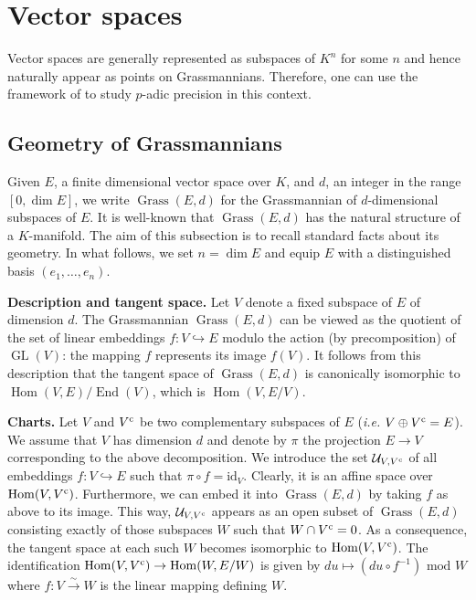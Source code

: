 \documentclass{sig-alternate-2013}
\DeclareMathOperator{\Hom}{Hom}
\DeclareMathOperator{\End}{End}
\DeclareMathOperator{\GL}{GL}
\DeclareMathOperator{\Grass}{Grass}
\newcommand{\id}{\textrm{id}}
\renewcommand{\c}{\text{\rm c}}
\def\todo#1{\ \!\!{\color{red} #1}}
\begin{document}
%

\section{Vector spaces}
\label{sec:vectorspaces}

Vector spaces are generally represented as subspaces of $K^n$ for some 
$n$ and hence naturally appear as points on Grassmannians. Therefore, 
one can use the framework of \cite[Appendix A]{caruso-roe-vaccon:14a} to 
study $p$-adic precision in this context.

\subsection{Geometry of Grassmannians}
\label{ssec:grassgeo}

Given $E$, a finite dimensional vector space over $K$, and $d$, an 
integer in the range $[0, \dim E]$, we write $\Grass(E,d)$ for the
Grassmannian of $d$-dimensional subspaces of $E$. It is well-known
that $\Grass(E,d)$ has the natural structure of a $K$-manifold. The aim of
this subsection is to recall standard facts about its geometry. In what follows,
we set $n = \dim E$ and equip $E$ with a distinguished basis
$(e_1, \ldots, e_n)$.

\smallskip

\noindent
{\bf Description and tangent space.}
Let $V$ denote a fixed subspace of $E$ of dimension $d$. The 
Grassmannian $\Grass(E,d)$ can be viewed as the quotient of the set 
of linear embeddings $f: V \hookrightarrow E$ modulo the action (by 
precomposition) of $\GL(V)$: the mapping $f$ represents its image 
$f(V)$. It follows from this description that the tangent space of 
$\Grass(E,d)$ is canonically isomorphic to $\Hom(V, E) / \End(V)$,
which is $\Hom(V, E/V)$.

\smallskip

\noindent
{\bf Charts.}
Let $V$ and $V^\c$ be two complementary subspaces of $E$ 
(\emph{i.e.} $V \oplus V^\c = E$). We assume that $V$ has 
dimension $d$ and denote by $\pi$ the projection $E \to V$ 
corresponding to the above decomposition. We introduce the set 
$\mathcal U_{V,V^\c}$ of all embeddings $f : V \hookrightarrow E$ 
such that $\pi \circ f = \id_V$. Clearly, it is an affine space over
$\Hom(V,V^\c)$. 
Furthermore, we can embed it into $\Grass(E,d)$ by taking $f$ as
above to its image. This way, $\mathcal U_{V,V^\c}$ appears as
an open subset of $\Grass(E,d)$ consisting exactly of those subspaces 
$W$ such that $W \cap V^\c = 0$. As a consequence, the tangent space 
at each such $W$ becomes isomorphic to $\Hom(V,V^\c)$. The
identification $\Hom(V,V^\c) \to \Hom(W, E/W)$ is given by
$du \mapsto (du \circ f^{-1}) \text{ mod } W$ where $f : V 
\stackrel{\sim}{\to} W$ is the linear mapping defining $W$.
\end{document}
